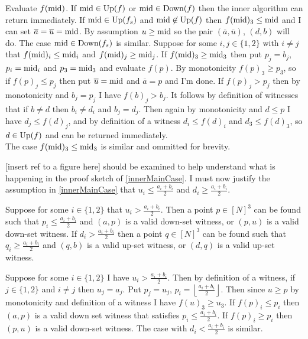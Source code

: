 \begin{sproof}
  Evaluate $f(\text{mid})$. If $\text{mid} \in \text{Up}(f)$ or
  $\text{mid} \in \text{Down}(f)$ then the inner algorithm can return immediately. If $\text{mid} \in \text{Up}(f_s)$ and $\text{mid} \not\in \text{Up}(f)$
  then $f(\text{mid})_3 \leq \text{mid}$ and I can set
  $\overline{a} = \overline{u} = \text{mid}$. By assumption $u \geq \text{mid}$ so the pair $(\overline{a}, \overline{u})$, $(d, b)$ will do.
  The case $\text{mid} \in \text{Down}(f_s)$ is similar.
  Suppose for some $i, j \in \{1, 2\}$ with $i \neq j$ that $f(\text{mid})_i \leq \text{mid}_i$ and $f(\text{mid})_j \geq \text{mid}_j$.
  If $f(\text{mid})_3 \geq \text{mid}_3$ then put $p_j = b_j$, $p_i = \text{mid}_i$ and $p_3 = \text{mid}_3$ and evaluate $f(p)$.  
  By monotonicity $f(p)_3 \geq p_3$, so if $f(p)_j \leq p_j$ then put $\overline{u} = \text{mid}$ and $\overline{a} = p$ and I'm done.
  If $f(p)_j > p_j$ then by monotonicity and $b_j = p_j$ I have $f(b)_j > b_j$. It follows by definition of witnesses that if $b \neq d$ then 
  $b_i \neq d_i$ and $b_j = d_j$. Then again by monotonicity and $d \leq p$ I have $d_j \leq f(d)_j$, and by definition
  of a witness $d_i \leq f(d)_i$ and $d_3 \leq f(d)_3$, so $d \in \text{Up}(f)$ and can be returned immediately. \\
  The case $f(\text{mid})_3 \leq \text{mid}_3$ is similar and ommitted for brevity.
\end{sproof}
[insert ref to a figure here] should be examined to help understand what is happening in the proof sketch of \cref{innerMainCase}.
I must now justify the assumption in \cref{innerMainCase} that $u_i \leq \frac{a_i + b_i}{2}$ and $d_i \geq \frac{a_i + b_i}{2}$.
\begin{lemma}\label{innerOtherCase}
  Suppose for some $i \in \{1, 2\}$ that $u_i > \frac{a_i + b_i}{2}$.
  Then a point $p \in [N]^3$ can be found such that $p_i \leq \frac{a_i + b_i}{2}$ and $(a, p)$ is a valid down-set
  witness, or $(p, u)$ is a valid down-set witness. 
  If $d_i > \frac{a_i + b_i}{2}$ then a point $q \in [N]^3$ can be found such that $q_i \geq \frac{a_i + b_i}{2}$ and $(q, b)$ is a valid up-set
  witness, or $(d, q)$ is a valid up-set witness. 
\end{lemma}
\begin{sproof}
  Suppose for some $i \in \{1, 2\}$ I have $u_i > \frac{a_i + b_i}{2}$. Then
  by definition of a witness, if $j \in \{1, 2\}$ and $i \neq j$ then $u_j = a_j$.
  Put $p_j = u_j$, $p_i = \left \lfloor \frac{a_i + b_i}{2} \right \rfloor$. Then since $u \geq p$ by monotonicity
  and definition of a witness I have $f(u)_3 \geq u_3$. If $f(p)_i \leq p_i$ then
  $(a, p)$ is a valid down set witness that satisfies $p_i \leq \frac{a_i + b_i}{2}$. If
  $f(p)_i \geq p_i$ then $(p, u)$ is a valid down-set witness.
  The case with $d_i < \frac{a_i + b_i}{2}$ is similar.
\end{sproof}
